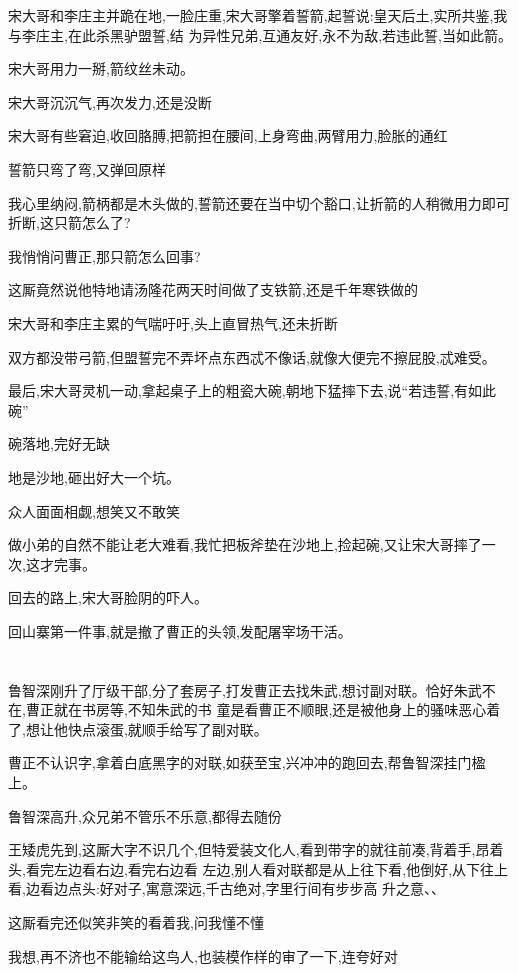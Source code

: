 ﻿\documentclass[12pt]{article}
\begin{document}
宋大哥和李庄主并跪在地,一脸庄重,宋大哥擎着誓箭,起誓说:皇天后土,实所共鉴,我与李庄主,在此杀黑驴盟誓,结
为异性兄弟,互通友好,永不为敌,若违此誓,当如此箭。

宋大哥用力一掰,箭纹丝未动。

宋大哥沉沉气,再次发力,还是没断

宋大哥有些窘迫,收回胳膊,把箭担在腰间,上身弯曲,两臂用力,脸胀的通红\dldots

誓箭只弯了弯,又弹回原样

我心里纳闷,箭柄都是木头做的,誓箭还要在当中切个豁口,让折箭的人稍微用力即可折断,这只箭怎么了?

我悄悄问曹正,那只箭怎么回事?

这厮竟然说他特地请汤隆花两天时间做了支铁箭,还是千年寒铁做的

宋大哥和李庄主累的气喘吁吁,头上直冒热气,还未折断

双方都没带弓箭,但盟誓完不弄坏点东西忒不像话,就像大便完不擦屁股,忒难受。

最后,宋大哥灵机一动,拿起桌子上的粗瓷大碗,朝地下猛摔下去,说``若违誓,有如此碗''

碗落地,完好无缺

地是沙地,砸出好大一个坑。

众人面面相觑,想笑又不敢笑

做小弟的自然不能让老大难看,我忙把板斧垫在沙地上,捡起碗,又让宋大哥摔了一次,这才完事。

回去的路上,宋大哥脸阴的吓人。

回山寨第一件事,就是撤了曹正的头领,发配屠宰场干活。

\section{}

鲁智深刚升了厅级干部,分了套房子,打发曹正去找朱武,想讨副对联。恰好朱武不在,曹正就在书房等,不知朱武的书
童是看曹正不顺眼,还是被他身上的骚味恶心着了,想让他快点滚蛋,就顺手给写了副对联。

曹正不认识字,拿着白底黑字的对联,如获至宝,兴冲冲的跑回去,帮鲁智深挂门楹上。

鲁智深高升,众兄弟不管乐不乐意,都得去随份

王矮虎先到,这厮大字不识几个,但特爱装文化人,看到带字的就往前凑,背着手,昂着头,看完左边看右边,看完右边看
左边,别人看对联都是从上往下看,他倒好,从下往上看,边看边点头:好对子,寓意深远,千古绝对,字里行间有步步高
升之意、、

这厮看完还似笑非笑的看着我,问我懂不懂

我想,再不济也不能输给这鸟人,也装模作样的审了一下,连夸好对
\end{document}
